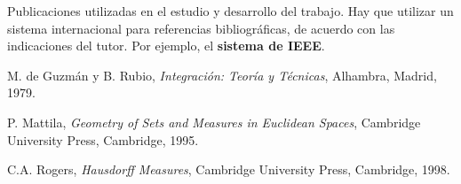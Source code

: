 \begin{thebibliography}{99}
 Publicaciones utilizadas en el estudio y desarrollo del trabajo.
Hay que utilizar un sistema internacional para referencias bibliográficas, de acuerdo con las indicaciones del tutor. Por ejemplo, el \textbf{sistema de IEEE}.

 M. de Guzmán y B. Rubio, \textit{Integración: Teoría y Técnicas}, Alhambra, Madrid, 1979.

 P. Mattila, \textit{Geometry of Sets and Measures in Euclidean Spaces}, Cambridge University Press, Cambridge, 1995.

 C.A. Rogers, \textit{Hausdorff Measures}, Cambridge University Press, Cambridge, 1998.

\end{thebibliography}
